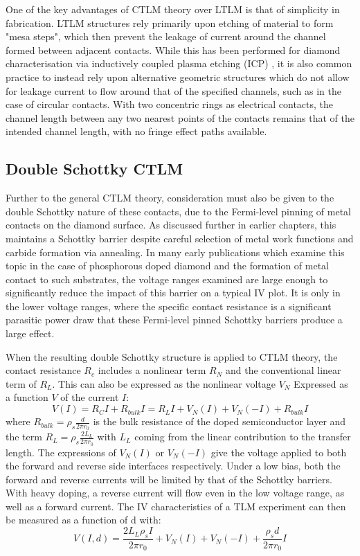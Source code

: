 One of the key advantages of CTLM theory over LTLM is that of simplicity in fabrication. LTLM structures rely primarily upon etching of material to form "mesa steps", which then prevent the leakage of current around the channel formed between adjacent contacts. While this has been performed for diamond characterisation via inductively coupled plasma etching (ICP) \cite{defeudis2019}, it is also common practice to instead rely upon alternative geometric structures which do not allow for leakage current to flow around that of the specified channels, such as in the case of circular contacts. With two concentric rings as electrical contacts, the channel length between any two nearest points of the contacts remains that of the intended channel length, with no fringe effect paths available.
\subsection{Double Schottky CTLM}
Further to the general CTLM theory, consideration must also be given to the double Schottky nature of these contacts, due to the Fermi-level pinning of metal contacts on the diamond surface. As discussed further in earlier chapters, this maintains a Schottky barrier despite careful selection of metal work functions and carbide formation via annealing. In many early publications which examine this topic in the case of phosphorous doped diamond and the formation of metal contact to such substrates, the voltage ranges examined are large enough to significantly reduce the impact of this barrier on a typical IV plot. It is only in the lower voltage ranges, where the specific contact resistance is a significant parasitic power draw that these Fermi-level pinned Schottky barriers produce a large effect. 

When the resulting double Schottky structure is applied to CTLM theory, the contact resistance $R_{c}$ includes a nonlinear term $R_{N}$ and the conventional linear term of $R_{L}$. This can also be expressed as the nonlinear voltage $V_{N}$ Expressed as a function $V$ of the current $I$:
\begin{equation}
    V(I) = R_{C}I + R_{bulk}I = R_{L}I + V_{N}(I) + V_{N}(-I) + R_{bulk}I
\end{equation}
where $R_{bulk} = \rho_{s}\frac{d}{2\pi r_{0}}$ is the bulk resistance of the doped semiconductor layer and the term $R_{L} = \rho_{s}\frac{2L_{L}}{2\pi r_{0}}$ with $L_{L}$ coming from the linear contribution to the transfer length. The expressions of $V_{N}(I)$ or $V_{N}(-I)$ give the voltage applied to both the forward and reverse side interfaces respectively. Under a low bias, both the forward and reverse currents will be limited by that of the Schottky barriers. With heavy doping, a reverse current will flow even in the low voltage range, as well as a forward current. The IV characteristics of a TLM experiment can then be measured as a function of d with:
\begin{equation}
    V(I,d) = \frac{2L_{L}\rho_{s}I}{2\pi r_{0}} + V_{N}(I) + V_{N}(-I) + \frac{\rho_{s}d}{2\pi r_{0}}I
    \label{eq:tlm_V(I,d)}
\end{equation}


